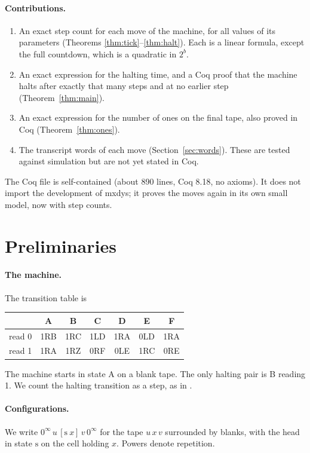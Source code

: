 \documentclass[11pt]{article}
\theoremstyle{remark}
\newcommand{\st}[1]{\mathrm{#1}}
\newcommand{\inftyl}{0^{\infty}}
\begin{document}
\paragraph{Contributions.}
\begin{enumerate}
\item An exact step count for each move of the machine, for all values of its
parameters (Theorems \ref{thm:tick}--\ref{thm:halt}). Each is a linear formula,
except the full countdown, which is a quadratic in $2^{b}$.
\item An exact expression for the halting time, and a Coq proof that the
machine halts after exactly that many steps and at no earlier step
(Theorem~\ref{thm:main}).
\item An exact expression for the number of ones on the final tape, also proved
in Coq (Theorem~\ref{thm:ones}).
\item The transcript words of each move (Section~\ref{sec:words}). These are
tested against simulation but are not yet stated in Coq.
\end{enumerate}
The Coq file is self-contained (about 890 lines, Coq 8.18, no axioms). It does
not import the development of mxdys; it proves the moves again in its own small
model, now with step counts.

\section{Preliminaries}

\paragraph{The machine.} The transition table is

\begin{center}
\begin{tabular}{lcccccc}
\toprule
 & A & B & C & D & E & F\\
\midrule
read 0 & 1RB & 1RC & 1LD & 1RA & 0LD & 1RA\\
read 1 & 1RA & 1RZ & 0RF & 0LE & 1RC & 0RE\\
\bottomrule
\end{tabular}
\end{center}

\noindent The machine starts in state A on a blank tape. The only halting pair
is B reading 1. We count the halting transition as a step, as in \cite{bb5}.

\paragraph{Configurations.} We write $\inftyl\, u\, [\st{s}\ x]\, v\, \inftyl$ for
the tape $u\,x\,v$ surrounded by blanks, with the head in state $\st{s}$ on the
cell holding $x$. Powers denote repetition.
\end{document}
